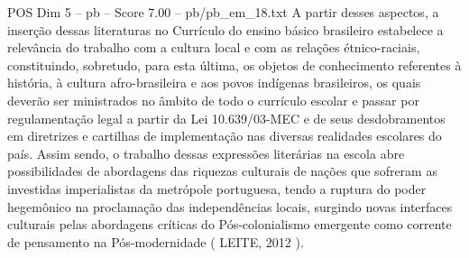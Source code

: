\begin{textsample}{POS Dim 5 – pb – Score 7.00 – pb/pb\_em\_18.txt}
A partir desses aspectos, a inserção dessas literaturas no Currículo do ensino básico brasileiro estabelece a relevância do trabalho com a cultura local e com as relações étnico-raciais, constituindo, sobretudo, para esta última, os objetos de conhecimento referentes à história, à cultura afro-brasileira e aos povos indígenas brasileiros, os quais deverão ser ministrados no âmbito de todo o currículo escolar e passar por regulamentação legal a partir da Lei 10.639/03-MEC e de seus desdobramentos em diretrizes e cartilhas de implementação nas diversas realidades escolares do país.
Assim sendo, o trabalho dessas expressões literárias na escola abre possibilidades de abordagens das riquezas culturais de nações que sofreram as investidas imperialistas da metrópole portuguesa, tendo a ruptura do poder hegemônico na proclamação das independências locais, surgindo novas interfaces culturais pelas abordagens críticas do Pós-colonialismo emergente como corrente de pensamento na Pós-modernidade ( LEITE, 2012 ).

\end{textsample}
